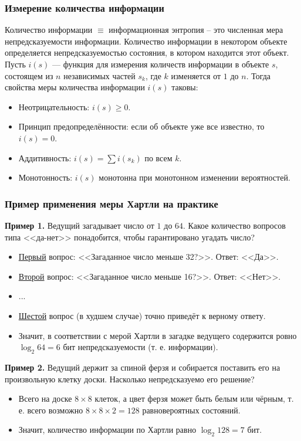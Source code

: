 \documentclass[10pt]{beamer}
\begin{document}
	\begin{frame}
		\frametitle{Измерение количества информации}
		Количество информации $\equiv$ информационная энтропия – это численная мера непредсказуемости информации. Количество информации в некотором объекте определяется непредсказуемостью состояния, в котором находится этот объект.
Пусть $i(s)$ — функция для измерения количеств информации в объекте $s$, состоящем из $n$ независимых частей $s_k$, где $k$ изменяется от $1$ до $n$. Тогда свойства меры количества информации $i(s)$ таковы:

		\begin{itemize}
			\item Неотрицательность: $i(s) \geq 0$.
			\item Принцип предопределённости: если об объекте уже все известно, то $i(s) = 0$.
			\item Аддитивность: $i(s) = \sum{i(s_k)}$ по всем $k$.
			\item Монотонность: $i(s)$ монотонна при монотонном изменении вероятностей.
		\end{itemize}
    	\end{frame}
  
	\begin{frame}
		\frametitle{Пример применения меры Хартли на практике}
		\begin{small}
		\textbf{Пример 1.} 
		Ведущий загадывает число от $1$ до $64$. Какое количество вопросов типа <<да-нет>> понадобится, чтобы гарантировано угадать число?
		\begin{itemize}
			\item \underline{Первый} вопрос: <<Загаданное число меньше 32?>>. Ответ: <<Да>>.
			\item \underline{Второй} вопрос: <<Загаданное число меньше 16?>>. Ответ: <<Нет>>.
			\item ...
			\item \underline{Шестой} вопрос (в худшем случае) точно приведёт к верному ответу.
			\item Значит, в соответствии с мерой Хартли в загадке ведущего содержится ровно $\log_2 64 = 6$ бит непредсказуемости (т. е. информации).
		\end{itemize}
		
		\textbf{Пример 2.}
		 Ведущий держит за спиной ферзя и собирается поставить его на произвольную клетку доски. Насколько непредсказуемо его решение?
		\begin{itemize}
			\item Всего на доске $8 \times 8$ клеток, а цвет ферзя может быть белым или чёрным, т. е. всего возможно $8 \times 8 \times 2 = 128$ равновероятных состояний.
			\item Значит, количество информации по Хартли равно $\log_2 128 = 7$ бит.
		\end{itemize}
		\end{small}
    	\end{frame}
  
\end{document}
